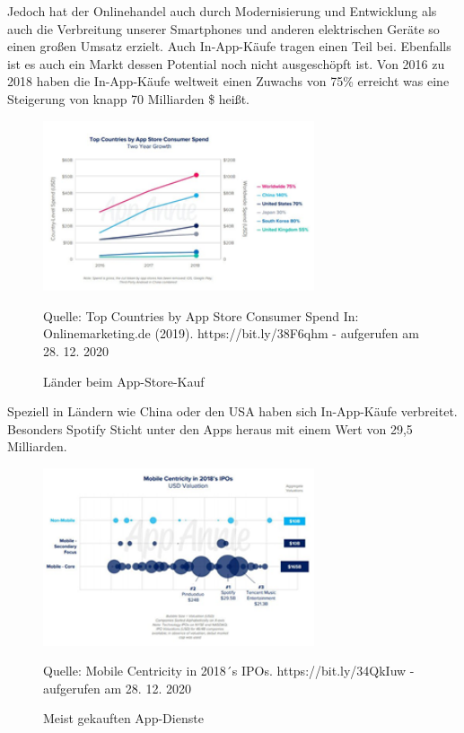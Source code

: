 \documentclass[a4paper, 12pt]{scrartcl}
\newcommand*{\bildquelle}{%
  \footnotesize Quelle:
}
\begin{document}
\noindent Jedoch hat der Onlinehandel auch durch Modernisierung und Entwicklung als auch die Verbreitung unserer Smartphones und anderen elektrischen Geräte so einen großen Umsatz erzielt. Auch In-App-Käufe tragen einen Teil bei. Ebenfalls ist es auch ein Markt dessen Potential noch nicht ausgeschöpft ist. Von 2016 zu 2018 haben die In-App-Käufe weltweit einen Zuwachs von 75\% erreicht was eine Steigerung von knapp 70 Milliarden \$ heißt.

 \begin{figure}[h]
    \begin{center}
        \includegraphics[width=8cm]{media/2.png}
        \caption{Länder beim App-Store-Kauf}
        \label{Länder Ranking}
        \bildquelle Top Countries by App Store Consumer Spend In: Onlinemarketing.de (2019). https://bit.ly/38F6qhm - aufgerufen am 28. 12. 2020
    \end{center}
\end{figure}


\noindent Speziell in Ländern wie China oder den USA haben sich In-App-Käufe verbreitet. Besonders Spotify Sticht unter den Apps heraus mit einem Wert von 29,5 Milliarden. 

 \begin{figure}[h]
    \begin{center}
        \includegraphics[width=8cm]{media/3.png}
        \caption{Meist gekauften App-Dienste }
        \label{App-Dienste}
        \bildquelle Mobile Centricity in 2018´s IPOs. https://bit.ly/34QkIuw - aufgerufen am 28. 12. 2020
    \end{center}
\end{figure}
\end{document}
